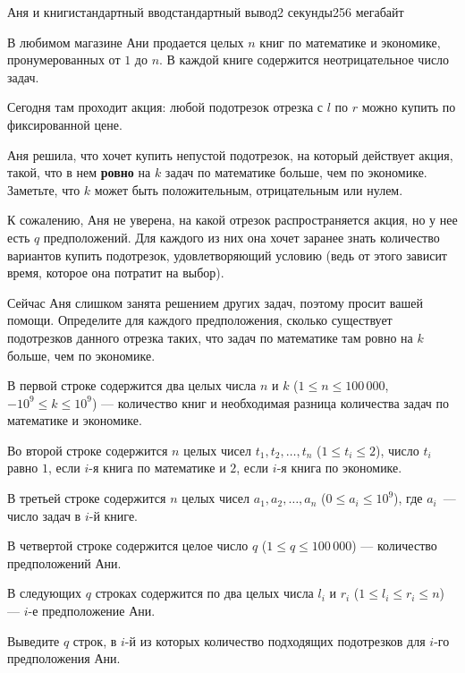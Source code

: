 \begin{problem}{Аня и книги}{стандартный ввод}{стандартный вывод}{2 секунды}{256 мегабайт}

В любимом магазине Ани продается целых $n$ книг по математике и экономике, пронумерованных от $1$ до $n$. В каждой книге содержится неотрицательное число задач.

Сегодня там проходит акция: любой подотрезок отрезка с $l$ по $r$ можно купить по фиксированной цене. 

Аня решила, что хочет купить непустой подотрезок, на который действует акция, такой, что в нем \textbf{ровно} на $k$ задач по математике больше, чем по экономике. Заметьте, что $k$ может быть положительным, отрицательным или нулем.

К сожалению, Аня не уверена, на какой отрезок распространяется акция, но у нее есть $q$ предположений. Для каждого из них она хочет заранее знать количество вариантов купить подотрезок, удовлетворяющий условию (ведь от этого зависит время, которое она потратит на выбор).

Сейчас Аня слишком занята решением других задач, поэтому просит вашей помощи. Определите для каждого предположения, сколько существует подотрезков данного отрезка таких, что задач по математике там ровно на $k$ больше, чем по экономике.

\InputFile
В первой строке содержится два целых числа $n$ и $k$ ($1 \le n \le 100\,000$, $-10^9 \le k \le 10^9$) --- количество книг и необходимая разница количества задач по математике и экономике.

Во второй строке содержится $n$ целых чисел $t_1, t_2, \ldots, t_n$ ($1 \le t_i \le 2$), число $t_i$ равно $1$, если $i$-я книга по математике и $2$, если $i$-я книга по экономике.

В третьей строке содержится $n$ целых чисел $a_1, a_2, \ldots, a_n$ ($0 \le a_i \le 10^9$), где $a_i$~--- число задач в $i$-й книге.

В четвертой строке содержится целое число $q$ ($1 \le q \le 100\,000$) --- количество предположений Ани.

В следующих $q$ строках содержится по два целых числа $l_i$ и $r_i$ ($1 \le l_i \le r_i \le n$) --- $i$-е предположение Ани.

\OutputFile
Выведите $q$ строк, в $i$-й из которых количество подходящих подотрезков для $i$-го предположения Ани.

\Examples

\begin{example}
%
%
\end{example}


\end{problem}
